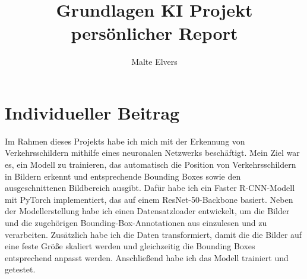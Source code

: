 \documentclass[runningheads]{llncs}
\begin{document}
%
\title{Grundlagen KI Projekt persönlicher Report}
%
%
\author {Malte Elvers}
%
%
%
\maketitle              %
%

%
%
\section{Individueller Beitrag}
Im Rahmen dieses Projekts habe ich mich mit der Erkennung von Verkehrsschildern mithilfe eines
neuronalen Netzwerks beschäftigt. Mein Ziel war es, ein Modell zu trainieren, das automatisch die
Position von Verkehrsschildern in Bildern erkennt und entsprechende Bounding Boxes sowie den
ausgeschnittenen Bildbereich ausgibt.
Dafür habe ich ein Faster R-CNN-Modell mit PyTorch implementiert, das auf einem ResNet-50-Backbone
basiert.
Neben der Modellerstellung habe ich einen Datensatzloader entwickelt, um die Bilder und die
zugehörigen Bounding-Box-Annotationen aus einzulesen und zu verarbeiten.
Zusätzlich habe ich die Daten transformiert, damit die die Bilder auf eine feste Größe
skaliert werden und gleichzeitig die Bounding Boxes entsprechend anpasst werden.
Anschließend habe ich das Modell trainiert und getestet.
\\
\end{document}
